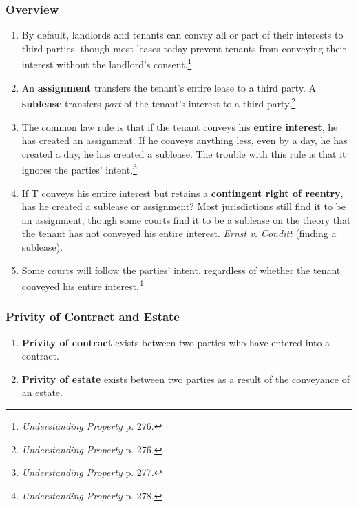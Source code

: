 \subsubsection{Overview}

\begin{enumerate}
    \item By default, landlords and tenants can convey all or part of their 
    interests to third parties, though most leases today prevent tenants from 
    conveying their interest without the landlord's 
    consent.\footnote{\emph{Understanding Property} p. 276.}
    \item An \textbf{assignment} transfers the tenant's entire lease to a 
    third party. A \textbf{sublease} transfers \emph{part} of the tenant's 
    interest to a third party.\footnote{\emph{Understanding Property} p. 276.}
    \item The common law rule is that if the tenant conveys his \textbf{entire 
    interest}, he has created an assignment. If he conveys anything less, even 
    by a day, he has created a day, he has created a sublease. The trouble 
    with this rule is that it ignores the parties' 
    intent.\footnote{\emph{Understanding Property} p. 277.}
    \item If T conveys his entire interest but retains a \textbf{contingent 
    right of reentry}, has he created a sublease or assignment? Most 
    jurisdictions still find it to be an assignment, though some courts find 
    it to be a sublease on the theory that the tenant has not conveyed his 
    entire interest. \emph{Ernst v. Conditt} (finding a sublease).
    \item Some courts will follow the parties' intent, regardless of whether 
    the tenant conveyed his entire interest.\footnote{\emph{Understanding 
    Property} p. 278.}
\end{enumerate}

\subsubsection{Privity of Contract and Estate}

\begin{enumerate}
    \item \textbf{Privity of contract} exists between two parties who have 
    entered into a contract.
    \item \textbf{Privity of estate} exists between two parties as a result of 
    the conveyance of an estate.
\end{enumerate}

